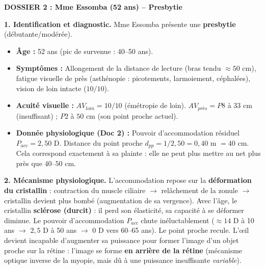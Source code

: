 \documentclass[11pt]{article}
\begin{document}
\begin{exoresolu}
\vspace{0.5cm}
\noindent\textbf{DOSSIER 2 : Mme Essomba (52 ans) -- Presbytie}

\textbf{1. Identification et diagnostic.}
Mme Essomba présente une \textbf{presbytie} (débutante/modérée).
\begin{itemize}
    \item \textbf{Âge :} 52 ans (pic de survenue : 40--50 ans).
    \item \textbf{Symptômes :} Allongement de la distance de lecture (bras tendu $\approx 50$ cm), fatigue visuelle de près (asthénopie : picotements, larmoiement, céphalées), vision de loin intacte ($10/10$).
    \item \textbf{Acuité visuelle :} $AV_{loin} = 10/10$ (émétropie de loin). $AV_{près} = P8$ à $33$ cm (insuffisant) ; $P2$ à $50$ cm (son point proche actuel).
    \item \textbf{Donnée physiologique (Doc 2) :} Pouvoir d'accommodation résiduel $P_{acc} = 2,50$ D. Distance du point proche $d_{pp} = 1/2,50 = 0,40$ m $= 40$ cm. Cela correspond exactement à sa plainte : elle ne peut plus mettre au net plus près que $40$--$50$ cm.
\end{itemize}

\textbf{2. Mécanisme physiologique.}
L'accommodation repose sur la \textbf{déformation du cristallin} : contraction du muscle ciliaire $\rightarrow$ relâchement de la zonule $\rightarrow$ cristallin devient plus bombé (augmentation de sa vergence). Avec l'âge, le cristallin \textbf{sclérose (durcit)} : il perd son élasticité, sa capacité à se déformer diminue. Le pouvoir d'accommodation $P_{acc}$ chute inéluctablement ($\approx 14$ D à 10 ans $\rightarrow$ $2,5$ D à 50 ans $\rightarrow$ $0$ D vers 60--65 ans). Le point proche recule. L'œil devient incapable d'augmenter sa puissance pour former l'image d'un objet proche sur la rétine : l'image se forme \textbf{en arrière de la rétine} (mécanisme optique inverse de la myopie, mais dû à une puissance insuffisante \emph{variable}).


\end{exoresolu}
\end{document}
